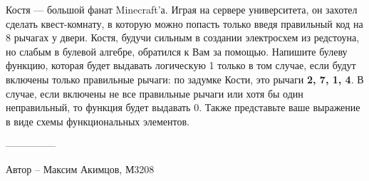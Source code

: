 \question
Костя — большой фанат Minecraft’а. Играя на сервере университета, он захотел сделать квест-комнату, в которую можно попасть только введя правильный код на 8 рычагах у двери. Костя, будучи сильным в создании электросхем из редстоуна, но слабым в булевой алгебре, обратился к Вам за помощью. Напишите булеву функцию, которая будет выдавать логическую 1 только в том случае, если будут включены только правильные рычаги: по задумке Кости, это рычаги \textbf{2, 7, 1, 4}. В случае, если включены не все правильные рычаги или хотя бы один неправильный, то функция будет выдавать 0. Также представьте ваше выражение в виде схемы функциональных элементов.

---------------

Автор -- Максим Акимцов, М3208